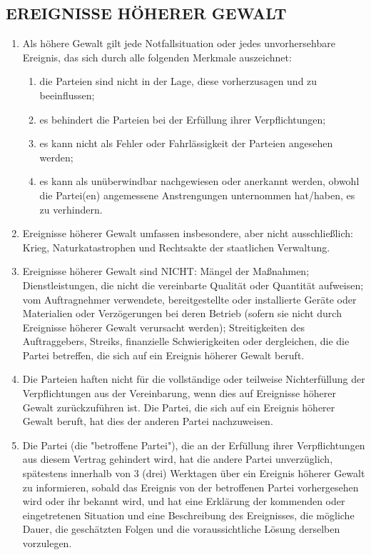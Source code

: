 \begin{multicols}{2}
   \subsection{EREIGNISSE HÖHERER GEWALT}
   \begin{enumerate}
     \item Als höhere Gewalt gilt jede Notfallsituation oder jedes unvorhersehbare Ereignis, das sich durch alle folgenden Merkmale auszeichnet:
     \begin{enumerate}
   \item die Parteien sind nicht in der Lage, diese vorherzusagen und zu beeinflussen;
   \item es behindert die Parteien bei der Erfüllung ihrer Verpflichtungen;
   \item es kann nicht als Fehler oder Fahrlässigkeit der Parteien angesehen werden;
   \item es kann als unüberwindbar nachgewiesen oder anerkannt werden, obwohl die Partei(en) angemessene Anstrengungen unternommen hat/haben, es zu verhindern.
   \end{enumerate}
   \item Ereignisse höherer Gewalt umfassen insbesondere, aber nicht ausschließlich: Krieg, Naturkatastrophen und Rechtsakte der staatlichen Verwaltung.
   \item Ereignisse höherer Gewalt sind NICHT: Mängel der Maßnahmen; Dienstleistungen, die nicht die vereinbarte Qualität oder Quantität aufweisen; vom Auftragnehmer verwendete, bereitgestellte oder installierte Geräte oder Materialien oder Verzögerungen bei deren Betrieb (sofern sie nicht durch Ereignisse höherer Gewalt verursacht werden); Streitigkeiten des Auftraggebers, Streiks, finanzielle Schwierigkeiten oder dergleichen, die die Partei betreffen, die sich auf ein Ereignis höherer Gewalt beruft.
   \item Die Parteien haften nicht für die vollständige oder teilweise Nichterfüllung der Verpflichtungen aus der Vereinbarung, wenn dies auf Ereignisse höherer Gewalt zurückzuführen ist. Die Partei, die sich auf ein Ereignis höherer Gewalt beruft, hat dies der anderen Partei nachzuweisen.
   \item Die Partei (die "betroffene Partei"), die an der Erfüllung ihrer Verpflichtungen aus diesem Vertrag gehindert wird, hat die andere Partei unverzüglich, spätestens innerhalb von 3 (drei) Werktagen über ein Ereignis höherer Gewalt zu informieren, sobald das Ereignis von der betroffenen Partei vorhergesehen wird oder ihr bekannt wird, und hat eine Erklärung der kommenden oder eingetretenen Situation und eine Beschreibung des Ereignisses, die mögliche Dauer, die geschätzten Folgen und die voraussichtliche Lösung derselben vorzulegen.

\end{enumerate}
\end{multicols}
